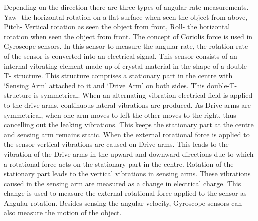 Depending on the direction there are three types of angular rate measurements. Yaw- the horizontal rotation on a flat surface when seen the object from above, Pitch- Vertical rotation as seen the object from front, Roll- the horizontal rotation when seen the object from front.
The concept of Coriolis force is used in Gyroscope sensors. In this sensor to measure the angular rate, the rotation rate of the sensor is converted into an electrical signal. 
This sensor consists of an internal vibrating element made up of crystal material in the shape of a double – T- structure. This structure comprises a stationary part in the centre with ‘Sensing Arm’ attached to it and ‘Drive Arm’ on both sides.
This double-T-structure is symmetrical. When an alternating vibration electrical field is applied to the drive arms, continuous lateral vibrations are produced. As Drive arms are symmetrical, when one arm moves to left the other moves to the right, thus cancelling out the leaking vibrations. This keeps the stationary part at the centre and sensing arm remains static.
When the external rotational force is applied to the sensor vertical vibrations are caused on Drive arms. This leads to the vibration of the Drive arms in the upward and downward directions due to which a rotational force acts on the stationary part in the centre.
Rotation of the stationary part leads to the vertical vibrations in sensing arms. These vibrations caused in the sensing arm are measured as a change in electrical charge. This change is used to measure the external rotational force applied to the sensor as Angular rotation. Besides sensing the angular velocity, Gyroscope sensors can also measure the motion of the object. 




